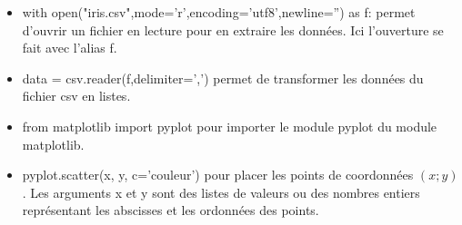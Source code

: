 \documentclass[11pt,a4paper]{article}
\begin{document}
\begin{itemize}
\item \textsf{with open("iris.csv",mode='r',encoding='utf8',newline='') as f:} permet d'ouvrir un fichier en lecture pour en extraire les données. Ici l'ouverture se fait avec l'alias \textsf{f}.
\item \textsf{data = csv.reader(f,delimiter=',')} permet de transformer les données du fichier \textsf{csv} en listes.
\item \textsf{from matplotlib import pyplot} pour importer le module \textsf{pyplot} du module \textsf{matplotlib}.
\item \textsf{pyplot.scatter(x, y, c='couleur')} pour placer les points de coordonnées $(x;y)$. Les arguments \textsf{x} et \textsf{y} sont des listes de valeurs ou des nombres entiers représentant les abscisses et les ordonnées des points.
\end{itemize}
\end{document}
